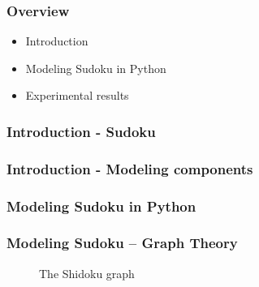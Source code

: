 \documentclass{beamer}
\title{\talktitle}
\author{\Us}
\date{\talkdate}
\begin{document}
\begin{frame}
  \titlepage
  \conferencebanner
\end{frame}

\begin{frame}
  \frametitle{Overview}

  \begin{itemize}
  \item<1-> Introduction
  \item<2-> Modeling Sudoku in Python
  \item<3-> Experimental results      
  \end{itemize}
\end{frame}

\begin{frame}
 \frametitle{Introduction - Sudoku}
 
 \sudokuexampleone
\end{frame}

\begin{frame}
 \frametitle{Introduction - Modeling components}
 
 \librarytable
\end{frame}

\begin{frame}[fragile]
 \frametitle{Modeling Sudoku in Python}
 
 
\end{frame}

\begin{frame}[fragile]
 \frametitle{Modeling Sudoku -- Graph Theory}

\begin{figure}[h]
\centering
\begin{dot2tex}[circo,mathmode,options={--graphstyle "scale=0.25"}]
  
\end{dot2tex}
\caption{The Shidoku graph}
\end{figure}
 
\end{frame}
\end{document}

